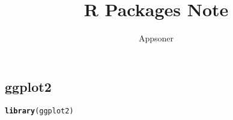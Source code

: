 \documentclass{article}\usepackage[]{graphicx}\usepackage[]{color}
\title{R Packages Note}
\author{Appsoner}
\makeatletter
\newcommand{\hlstd}[1]{\textcolor[rgb]{0.345,0.345,0.345}{#1}}%
\newcommand{\hlkwd}[1]{\textcolor[rgb]{0.737,0.353,0.396}{\textbf{#1}}}%
\newenvironment{kframe}{%
 \def\at@end@of@kframe{}%
 \ifinner\ifhmode%
  \def\at@end@of@kframe{\end{minipage}}%
  \begin{minipage}{\columnwidth}%
 \fi\fi%
 \def\FrameCommand##1{\hskip\@totalleftmargin \hskip-\fboxsep
 \colorbox{shadecolor}{##1}\hskip-\fboxsep
     \hskip-\linewidth \hskip-\@totalleftmargin \hskip\columnwidth}%
 \MakeFramed {\advance\hsize-\width
   \@totalleftmargin\z@ \linewidth\hsize
   \@setminipage}}%
 {\par\unskip\endMakeFramed%
 \at@end@of@kframe}
\newenvironment{knitrout}{}{} %
\makeatother
\begin{document}
\begin{CJK*}{UTF8}{gkai}
\maketitle
\tableofcontents
\section{ggplot2}
\begin{knitrout}
\color{fgcolor}\begin{kframe}
\begin{alltt}
\hlkwd{library}\hlstd{(ggplot2)}
\end{alltt}
\end{kframe}
\end{knitrout}

\end{CJK*}
\end{document}
